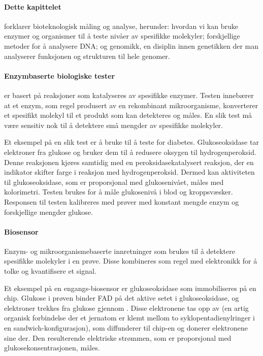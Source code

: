 
\paragraph{Dette kapittelet} forklarer bioteknologisk måling og analyse, herunder: hvordan vi kan bruke enzymer og organismer til å teste nivåer av spesifikke molekyler; forskjellige metoder for å analysere DNA; og genomikk, en disiplin innen genetikken der man analyserer funksjonen og strukturen til hele genomer.


\paragraph{Enzymbaserte biologiske tester} er basert på reaksjoner som katalyseres av spesifikke enzymer. Testen innebærer at et enzym, som regel produsert av en rekombinant mikroorganisme, konverterer et spesifikt molekyl til et produkt som kan detekteres og måles. En slik test må være sensitiv nok til å detektere små mengder av spesifikke molekyler. 

Et eksempel på en slik test er å bruke  til å teste for diabetes. Glukoseoksidase tar elektroner fra glukose og bruker dem til å redusere oksygen til hydrogenperoksid. Denne reaksjonen kjøres samtidig med en peroksidasekatalysert reaksjon, der en indikator skifter farge i reaksjon med hydrogenperoksid. Dermed kan aktiviteten til glukoseoksidase, som er proporsjonal med glukosenivået, måles med kolorimetri. Testen brukes for å måle glukosenivå i blod og kroppsvæsker. Responsen til testen kalibreres med prøver med konstant mengde enzym og forskjellige mengder glukose.

\paragraph{Biosensor} Enzym- og mikroorganismebaserte innretninger som brukes til å detektere spesifikke molekyler i en prøve. Disse kombineres som regel med elektronikk for å tolke og kvantifisere et signal.

Et eksempel på en engangs-biosensor er glukoseoksidase som immobiliseres  på en chip. Glukose i prøven binder FAD på det aktive setet i glukoseoksidase, og elektroner trekkes fra glukose gjennom . Disse elektronene tas opp av  (en artig organisk forbindelse der et jernatom er klemt mellom to syklopentadienylringer i en sandwich-konfigurasjon), som diffunderer til chip-en og donerer elektronene sine der. Den resulterende elektriske strømmen, som er proporsjonal med glukosekonsentrasjonen, måles.


